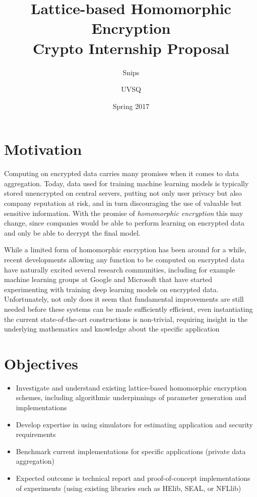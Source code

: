 \documentclass{article}
\title{Lattice-based Homomorphic Encryption \\ {\large Crypto Internship Proposal}}
\author{{\small Snips} \and {\small UVSQ}}
\date{Spring 2017}
\begin{document}
\maketitle

\section*{Motivation}
Computing on encrypted data carries many promises when it comes to data aggregation. Today, data used for training machine learning models is typically stored unencrypted on central servers, putting not only user privacy but also company reputation at risk, and in turn discouraging the use of valuable but sensitive information. With the promise of \emph{homomorphic encryption} this may change, since companies would be able to perform learning on encrypted data and only be able to decrypt the final model.

While a limited form of homomorphic encryption has been around for a while, recent developments allowing any function to be computed on encrypted data have naturally excited several research communities, including for example machine learning groups at Google and Microsoft that have started experimenting with training deep learning models on encrypted data. Unfortunately, not only does it seem that fundamental improvements are still needed before these systems can be made sufficiently efficient, even instantiating the current state-of-the-art constructions is non-trivial, requiring insight in the underlying mathematics and knowledge about the specific application

\section*{Objectives}
\begin{itemize}
\item Investigate and understand existing lattice-based homomorphic encryption schemes, including algorithmic underpinnings of parameter generation and implementations
\item Develop expertise in using simulators for estimating application and security requirements
\item Benchmark current implementations for specific applications (private data aggregation)
\item Expected outcome is technical report and proof-of-concept implementations of experiments (using existing libraries such as HElib, SEAL, or NFLlib)
\end{itemize}
\end{document}
